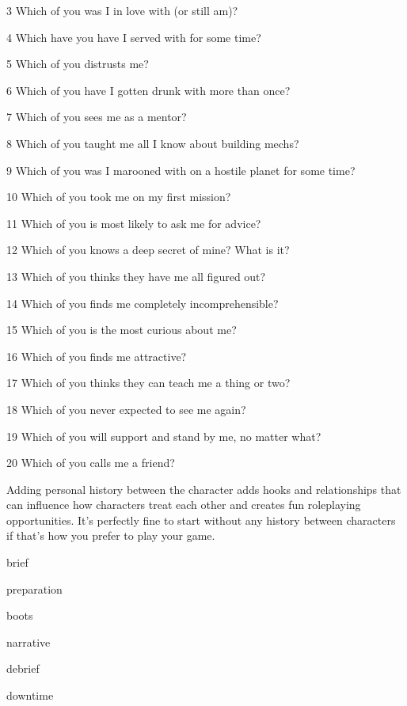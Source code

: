  3         Which of you was I in love with (or still am)?

 4         Which have you have I served with for some time?

 5         Which of you distrusts me?

 6         Which of you have I gotten drunk with more than once?

 7         Which of you sees me as a mentor?

 8         Which of you taught me all I know about building mechs?

 9         Which of you was I marooned with on a hostile planet for some time?

10       Which of you took me on my first mission?

  11       Which of you is most likely to ask me for advice?

  12       Which of you knows a deep secret of mine? What is it?

  13       Which of you thinks they have me all figured out?

  14       Which of you finds me completely incomprehensible?

  15       Which of you is the most curious about me?

  16       Which of you finds me attractive?

  17       Which of you thinks they can teach me a thing or two?

  18       Which of you never expected to see me again?

  19       Which of you will support and stand by me, no matter what?

  20       Which of you calls me a friend?

Adding personal history between the character adds hooks and relationships that can influence
how characters treat each other and creates fun roleplaying opportunities. It’s perfectly fine to
start without any history between characters if that’s how you prefer to play your game.

{brief}

{preparation}

{boots}

{narrative}

{debrief}

{downtime}
